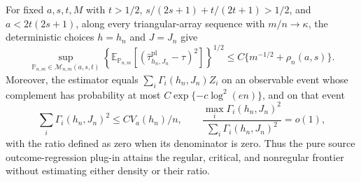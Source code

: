 For fixed \(a,s,t,M\) with \(t>1/2\), \(s/(2s+1)+t/(2t+1)>1/2\), and \(a<2t(2s+1)\), along every triangular-array sequence with \(m/n\to\kappa\), the deterministic choices \(h=h_n\) and \(J=J_n\) give
\[
\sup_{\mathbb P_{n,m}\in\mathcal M_{n,m}(a,s,t)}
\left\{\mathbb E_{\mathbb P_{n,m}}[(\widehat\tau^{\mathrm{pl}}_{h_n,J_n}-\tau)^2]\right\}^{1/2}
\le C\{m^{-1/2}+\rho_n(a,s)\}.
\]
Moreover, the estimator equals \(\sum_i\Gamma_i(h_n,J_n)Z_i\) on an observable event whose complement has probability at most \(C\exp\{-c\log^2(en)\}\), and on that event
\[
\sum_i\Gamma_i(h_n,J_n)^2\le C V_a(h_n)/n,
\qquad
\frac{\max_i\Gamma_i(h_n,J_n)^2}{\sum_i\Gamma_i(h_n,J_n)^2}=o(1),
\]
with the ratio defined as zero when its denominator is zero. Thus the pure source outcome-regression plug-in attains the regular, critical, and nonregular frontier without estimating either density or their ratio.